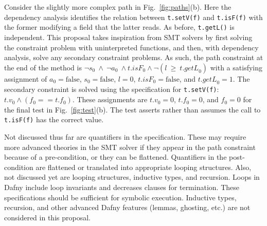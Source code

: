 \documentclass[11pt,onecolumn,notitlepage]{article}
\newcommand{\figref}[1]{Fig.~\ref{#1}}
\begin{document}
Consider the slightly more complex path in \figref{fig:paths}(b). Here the dependency analysis identifies the relation between \texttt{t.setV(f)} and \texttt{t.isF(f)} with the former modifying a field that the latter reads. As before, \texttt{t.getL()} is independent. This proposal takes inspiration from SMT solvers by first solving the constraint problem with uninterpreted functions, and then, with dependency analysis, solve any secondary constraint problems. As such, the path constraint at the end of the method is $\neg s_0\ \wedge\ \neg a_0\ \wedge \mathit{t.isF}_0 \wedge \neg(l\ \ge\ \mathit{t.getL}_0)$ with a satisfying assignment of $a_0 = \mathrm{false}$, $s_0 = \mathrm{false}$, $\mathit{l} = 0$, $\mathit{t.isF}_0 = \mathrm{false}$, and $\mathit{t.getL}_0 = 1$. The secondary constraint is solved using the specification for \texttt{t.setV(f)}: $t.v_0 \wedge (f_0 == t.f_0)$. These assignments are $t.v_0 = 0$, $t.f_0 = 0$, and $f_0 = 0$ for the final test in \figref{fig:test}(b). The test asserts rather than assumes the call to \texttt{t.isF(f)} has the correct value.

\begin{comment}
Symbolic execution must track side-effecting calls and introduce new uninterpreted functions as appropriate. For example, a second call to \texttt{T.isF(f : int)} should create a new uninterpreted function since its value might be different from the first call, and such information should be captured in the symbol table and path constraint as appropriate. Also note that it is possible to skip the secondary constraint problem with the flattened contracts to rather over-approximate actual program behavior using mocks. The mocks can be configured to return the needed sequence of program values to test the path. Depending on the code being tested, such an over-approximation may be sufficient for the test though there are two things to consider: first, what if such a path is not feasible in any real execution (i.e., there does not exist any input that would exercise that path); and second, what does a passing or failing test mean? Here it is not clear if such an over-approximation is sound and the question merits further investigation.
\end{comment}

Not discussed thus far are quantifiers in the specification. These may require more advanced theories in the SMT solver if they appear in the path constraint because of a pre-condition, or they can be flattened. Quantifiers in the post-condition are flattened or translated into appropriate looping structures. Also, not discussed yet are looping structures, inductive types, and recursion. Loops in Dafny include loop invariants and decreases clauses for termination. These specifications should be sufficient for symbolic execution.  Inductive types, recursion, and other advanced Dafny features (lemmas, ghosting, etc.) are not considered in this proposal. 
\end{document}
